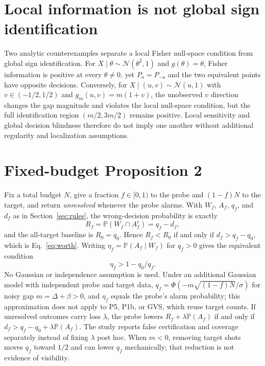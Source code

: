\documentclass[10pt,twocolumn]{article}
\newcommand{\Prb}{\mathbb{P}}
\begin{document}
\section{Local information is not global sign identification}\label{app:local}

Two analytic counterexamples separate a local Fisher null-space condition from
global sign identification. For $X\mid\theta\sim\mathcal N(\theta^2,1)$ and
$g(\theta)=\theta$, Fisher information is positive at every $\theta\neq0$, yet
$P_a=P_{-a}$ and the two equivalent points have opposite decisions. Conversely,
for $X\mid(u,v)\sim\mathcal N(u,1)$ with $v\in(-1/2,1/2)$ and
$g_m(u,v)=m(1+v)$, the unobserved $v$ direction changes the gap magnitude and
violates the local null-space condition, but the full identification region
$(m/2,3m/2)$ remains positive. Local sensitivity and global decision blindness
therefore do not imply one another without additional regularity and
localization assumptions.

\section{Fixed-budget Proposition 2}\label{app:prop2}

Fix a total budget $N$, give a fraction $f\in[0,1)$ to the probe and
$(1-f)N$ to the target, and return \emph{unresolved} whenever the probe alarms.
With $W_f$, $A_f$, $q_f$, and $d_f$ as in Section~\ref{sec:rules}, the wrong-decision
probability is exactly
\begin{equation}
  R_f=\Prb(W_f\cap A_f^{c})=q_f-d_f,
\end{equation}
and the all-target baseline is $R_0=q_0$. Hence $R_f<R_0$ if and only if
$d_f>q_f-q_0$, which is Eq.~\eqref{eq:worth}. Writing
$\eta_f=\Prb(A_f\mid W_f)$ for $q_f>0$ gives the equivalent condition
\begin{equation}
  \eta_f>1-q_0/q_f.
\end{equation}
No Gaussian or independence assumption is used. Under an additional Gaussian
model with independent probe and target data, $q_f=\Phi(-m\sqrt{(1-f)N}/\sigma)$
for noisy gap $m=\Delta+\beta>0$, and $\eta_f$ equals the probe's alarm
probability; this approximation does not apply to P5, P1b, or GVS, which reuse
target counts. If unresolved outcomes carry loss $\lambda$, the probe lowers
$R_f+\lambda\Prb(A_f)$ if and only if $d_f>q_f-q_0+\lambda\Prb(A_f)$. The study
reports false certification and coverage separately instead of fixing
$\lambda$ post hoc. When $m<0$, removing target shots moves $q_f$ toward $1/2$
and can lower $q_f$ mechanically; that reduction is not evidence of
visibility.
\end{document}
